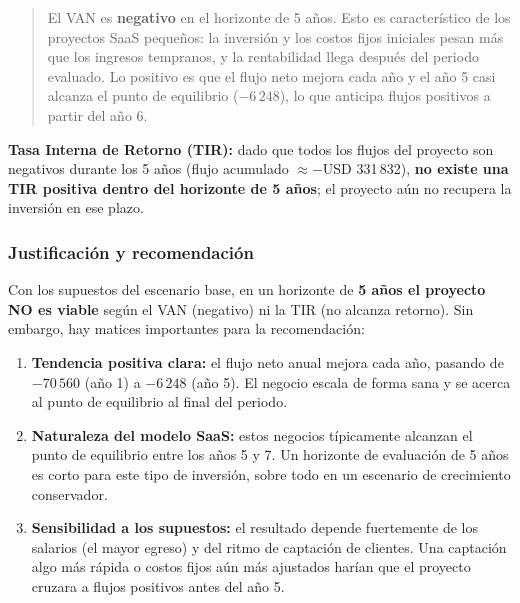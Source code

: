 \begin{quote}
El VAN es \textbf{negativo} en el horizonte de 5 años. Esto es característico de los
proyectos SaaS pequeños: la inversión y los costos fijos iniciales pesan más que los
ingresos tempranos, y la rentabilidad llega después del periodo evaluado. Lo positivo
es que el flujo neto mejora cada año y el año 5 casi alcanza el punto de equilibrio
($-6\,248$), lo que anticipa flujos positivos a partir del año 6.
\end{quote}

\noindent\textbf{Tasa Interna de Retorno (TIR):} dado que todos los flujos del proyecto
son negativos durante los 5 años (flujo acumulado $\approx -$USD 331\,832),
\textbf{no existe una TIR positiva dentro del horizonte de 5 años}; el proyecto aún no
recupera la inversión en ese plazo.

\subsubsection{Justificación y recomendación}
Con los supuestos del escenario base, en un horizonte de \textbf{5 años el proyecto NO
es viable} según el VAN (negativo) ni la TIR (no alcanza retorno). Sin embargo, hay
matices importantes para la recomendación:

\begin{enumerate}
  \item \textbf{Tendencia positiva clara:} el flujo neto anual mejora cada año, pasando
        de $-70\,560$ (año 1) a $-6\,248$ (año 5). El negocio escala de forma sana y se
        acerca al punto de equilibrio al final del periodo.
  \item \textbf{Naturaleza del modelo SaaS:} estos negocios típicamente alcanzan el
        punto de equilibrio entre los años 5 y 7. Un horizonte de evaluación de 5 años
        es corto para este tipo de inversión, sobre todo en un escenario de crecimiento
        conservador.
  \item \textbf{Sensibilidad a los supuestos:} el resultado depende fuertemente de los
        salarios (el mayor egreso) y del ritmo de captación de clientes. Una captación
        algo más rápida o costos fijos aún más ajustados harían que el proyecto cruzara
        a flujos positivos antes del año 5.
\end{enumerate}

